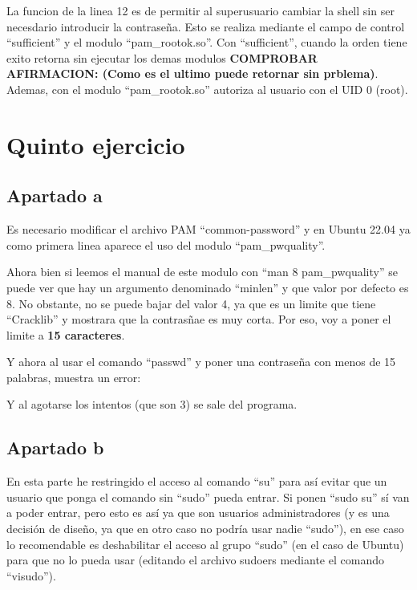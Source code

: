 \documentclass{article}
\begin{document}
La funcion de la linea 12 es de permitir al superusuario cambiar la shell sin ser necesdario introducir la contraseña. Esto se realiza mediante el campo de control ``sufficient'' y el modulo ``pam\_rootok.so''. Con ``sufficient'', cuando la orden tiene exito retorna sin ejecutar los demas modulos \textbf{COMPROBAR AFIRMACION: (Como es el ultimo puede retornar sin prblema)}. Ademas, con el modulo ``pam\_rootok.so'' autoriza al usuario con el UID 0 (root).


\section{Quinto ejercicio}

\subsection{Apartado a}
Es necesario modificar el archivo PAM ``common-password'' y en Ubuntu 22.04 ya como primera linea aparece el uso del modulo ``pam\_pwquality''. 

Ahora bien si leemos el manual de este modulo con ``man 8 pam\_pwquality'' se puede ver que hay un argumento denominado ``minlen'' y que valor por defecto es 8. No obstante, no se puede bajar del valor 4, ya que es un limite que tiene ``Cracklib'' y mostrara que la contrasñae es muy corta. Por eso, voy a poner el limite a \textbf{15 caracteres}.


Y ahora al usar el comando ``passwd'' y poner una contraseña con menos de 15 palabras, muestra un error:


Y al agotarse los intentos (que son 3) se sale del programa.
\subsection{Apartado b}
En esta parte he restringido el acceso al comando ``su'' para así evitar que un usuario que ponga el comando sin ``sudo'' pueda entrar. Si ponen ``sudo su'' sí van a poder entrar, pero esto es así ya que son usuarios administradores (y es una decisión de diseño, ya que en otro caso no podría usar nadie ``sudo''), en ese caso lo recomendable es deshabilitar el acceso al grupo ``sudo'' (en el caso de Ubuntu) para que no lo pueda usar (editando el archivo sudoers mediante el comando ``visudo'').
\end{document}
